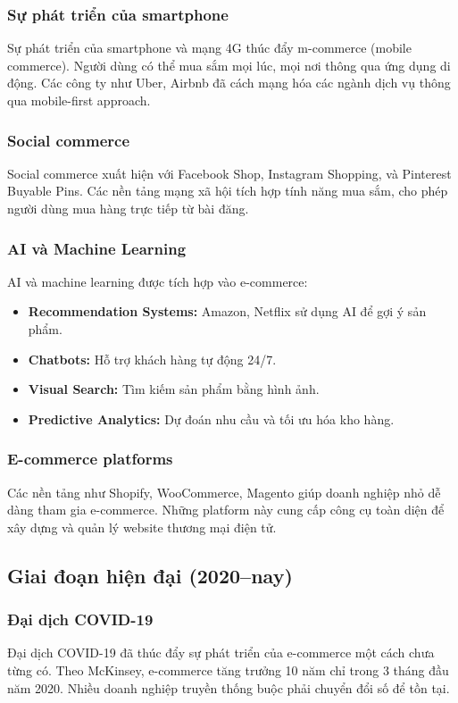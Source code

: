 \documentclass[a4paper,12pt]{report}
\begin{document}
\subsubsection{Sự phát triển của smartphone}
Sự phát triển của smartphone và mạng 4G thúc đẩy m-commerce (mobile commerce). Người dùng có thể mua sắm mọi lúc, mọi nơi thông qua ứng dụng di động. Các công ty như Uber, Airbnb đã cách mạng hóa các ngành dịch vụ thông qua mobile-first approach.

\subsubsection{Social commerce}
Social commerce xuất hiện với Facebook Shop, Instagram Shopping, và Pinterest Buyable Pins. Các nền tảng mạng xã hội tích hợp tính năng mua sắm, cho phép người dùng mua hàng trực tiếp từ bài đăng.

\subsubsection{AI và Machine Learning}
AI và machine learning được tích hợp vào e-commerce:
\begin{itemize}
    \item \textbf{Recommendation Systems:} Amazon, Netflix sử dụng AI để gợi ý sản phẩm.
    \item \textbf{Chatbots:} Hỗ trợ khách hàng tự động 24/7.
    \item \textbf{Visual Search:} Tìm kiếm sản phẩm bằng hình ảnh.
    \item \textbf{Predictive Analytics:} Dự đoán nhu cầu và tối ưu hóa kho hàng.
\end{itemize}

\subsubsection{E-commerce platforms}
Các nền tảng như Shopify, WooCommerce, Magento giúp doanh nghiệp nhỏ dễ dàng tham gia e-commerce. Những platform này cung cấp công cụ toàn diện để xây dựng và quản lý website thương mại điện tử.

\subsection{Giai đoạn hiện đại (2020--nay)}

\subsubsection{Đại dịch COVID-19}
Đại dịch COVID-19 đã thúc đẩy sự phát triển của e-commerce một cách chưa từng có. Theo McKinsey, e-commerce tăng trưởng 10 năm chỉ trong 3 tháng đầu năm 2020. Nhiều doanh nghiệp truyền thống buộc phải chuyển đổi số để tồn tại.
\end{document}
